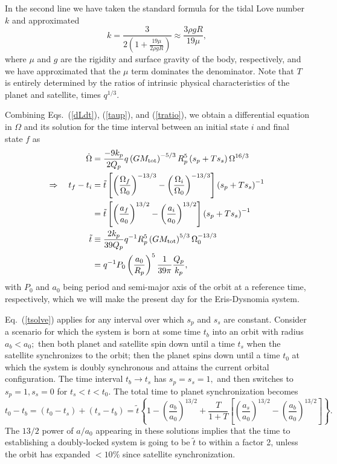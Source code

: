 \documentclass[onecolumn]{aastex631}
\begin{document}
In the second line we have taken the standard formula for the tidal Love number $k$ \citep[Eq. 3 from][]{Goldreich68} and approximated
\begin{equation}
  k = \frac{3}{2\left(1+\frac{19\mu}{2\rho g R}\right)} \approx \frac{3\rho g R}{19\mu},
\end{equation}
where $\mu$ and $g$ are the rigidity and surface gravity of the body, respectively, and we have approximated that the $\mu$ term dominates the denominator.  Note that $T$ is entirely determined by the ratios of intrinsic physical characteristics of the planet and satellite, times $q^{1/3}.$

Combining Eqs.~(\ref{dLdt}), (\ref{taup}), and (\ref{tratio}), we obtain a differential equation in $\Omega$ and its solution for the time interval between an initial state $i$ and final state $f$ as
\begin{align}
  \dot\Omega & = \frac{-9k_p}{2Q_p}q \left(GM_{\rm tot}\right)^{-5/3} R_p^5 \left(s_p + Ts_s\right) \Omega^{16/3} \\
  \Rightarrow \quad t_f - t_i & = \tilde t \left[ \left(\frac{\Omega_f}{\Omega_0}\right)^{-13/3}
                                - \left(\frac{\Omega_i}{\Omega_0}\right)^{-13/3} \right]  \left(s_p + Ts_s\right)^{-1}\\
             & = \tilde t \left[ \left(\frac{a_f}{a_0}\right)^{13/2}
               - \left(\frac{a_i}{a_0}\right)^{13/2} \right] \left(s_p + Ts_s\right)^{-1} \label{tsolve} \\
  \tilde t & \equiv \frac{2 k_p}{39 Q_p} q^{-1} R_p^5 \left(GM_{\rm tot}\right)^{5/3} \Omega_0^{-13/3} \nonumber \\
             & =  q^{-1} P_0 \left(\frac{a_0}{R_p}\right)^{5} \frac{1}{39\pi}\frac{Q_p}{k_p}, \label{tildet}
\end{align}
with $P_0$ and $a_0$ being period and semi-major axis of the orbit at a reference time, respectively, which we will make the present day for the Eris-Dysnomia system.

Eq.~(\ref{tsolve}) applies for any interval over which $s_p$ and $s_s$ are constant.  Consider a scenario for which the system is born at some time $t_b$ into an orbit with radius $a_b < a_0;$ then both planet and satellite spin down until a time $t_s$ when the satellite synchronizes to the orbit; then the planet spins down until a time $t_0$ at which the system is doubly synchronous and attains the current orbital configuration.  The time interval $t_b\rightarrow t_s$ has $s_p=s_s=1,$ and then switches to $s_p=1, s_s=0$ for $t_s<t<t_0.$ The total time to planet synchronization becomes
\begin{equation}
  t_0-t_b = (t_0-t_s) + (t_s-t_b) = \tilde t \left\{ 1 - \left(\frac{a_b}{a_0}\right)^{13/2} +\frac{T}{1+T} \left[\left(\frac{a_s}{a_0}\right)^{13/2} -  \left(\frac{a_b}{a_0}\right)^{13/2} \right]\right\}.
  \label{ttot1}
\end{equation}
The $13/2$ power of $a/a_0$ appearing in these solutions implies that the time to establishing a doubly-locked system is going to be $\tilde t$ to within a factor 2, unless the orbit has expanded $<10\%$ since satellite synchronization.
\end{document}
